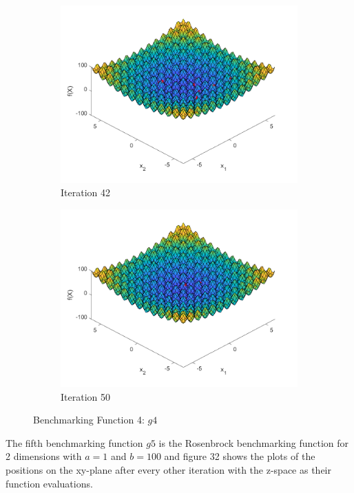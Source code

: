 \begin{figure}
\begin{subfigure}[b]{0.4\textwidth}
    \includegraphics[width=\textwidth]{img/smpl/rast2d/loa-iter-42}
    \caption{Iteration 42}
    \label{fig:s4-iter-6}
  \end{subfigure}
  \begin{subfigure}[b]{0.4\textwidth}
    \includegraphics[width=\textwidth]{img/smpl/rast2d/loa-iter-50}
    \caption{Iteration 50}
    \label{fig:s4-iter-7}
  \end{subfigure}
  \caption{Benchmarking Function 4: $g4$}
\end{figure}


\par The fifth benchmarking function $g5$ is the Rosenbrock benchmarking function for 2 dimensions with $a = 1$ and $b=100$ and figure 32 shows the plots of the positions on the xy-plane after every other iteration with the z-space as their function evaluations.

